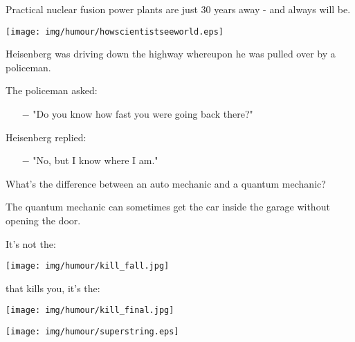 Practical nuclear fusion power plants are just 30 years away - and always will be.
	
	\pagebreak
	\begin{center}
	\texttt{[image: img/humour/howscientistseeworld.eps]}
	\end{center}
	
	\pagebreak
	
	Heisenberg was driving down the highway whereupon he was pulled over by a policeman. 

	The policeman asked:
	
	\begin{itemize}	 
		\item[$-$] "Do you know how fast you were going back there?"
	\end{itemize}
	
	Heisenberg replied: 
	
	\begin{itemize}	 
		\item[$-$] "No, but I know where I am."
	\end{itemize}
	\begin{center}\underline{\hspace{5 cm}}\end{center}
	
	What's the difference between an auto mechanic and a quantum mechanic?
	
	The quantum mechanic can sometimes get the car inside the garage without opening the door.
	
	\begin{center}\underline{\hspace{5 cm}}\end{center}
	
	\begin{center}
	It's not the:
	
	\texttt{[image: img/humour/kill\_fall.jpg]}
	\end{center}
	
	\begin{center}
	that kills you, it's the:
	\end{center}
	
	\begin{center}
	\texttt{[image: img/humour/kill\_final.jpg]}
	\end{center}
	

	\begin{center}
	\texttt{[image: img/humour/superstring.eps]}
	\end{center}
\begin{center}\underline{\hspace{5 cm}}\end{center}
	
